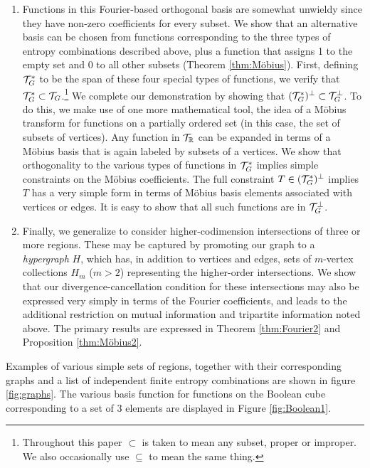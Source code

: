 \documentclass[12pt]{article}
\theoremstyle{definition}
\begin{document}
\begin{enumerate}
\item 
Functions in this Fourier-based orthogonal basis are somewhat unwieldy since they have non-zero coefficients for every subset. We show that an alternative basis can be chosen from functions corresponding to the three types of entropy combinations described above, plus a function that assigns 1 to the empty set and 0 to all other subsets (Theorem \ref{thm:Möbius}). First, defining ${\cal T}_G^*$ to be the span of these four special types of functions, we verify that ${\cal T}_G^* \subset {\cal T}_G$.\footnote{Throughout this paper $\subset$ is taken to mean any subset, proper or improper. We also occasionally use $\subseteq$ to mean the same thing.}  We complete our demonstration by showing that $({\cal T}_G^*)^\perp \subset {\cal T}_G^\perp$. To do this, we make use of one more mathematical tool, the idea of a Möbius transform for functions on a partially ordered set (in this case, the set of subsets of vertices). Any function in ${\cal T}_\mathbb{R}$ can be expanded in terms of a Möbius basis that is again labeled by subsets of a vertices. We show that orthogonality to the various types of functions in ${\cal T}_G^*$ implies simple constraints on the Möbius coefficients. The full constraint $T \in ({\cal T}_G^*)^\perp$ implies $T$ has a very simple form in terms of Möbius basis elements associated with vertices or edges. It is easy to show that all such functions are in ${\cal T}_G^\perp$. 
\item 
Finally, we generalize to consider higher-codimension intersections of three or more regions. These may be captured by promoting our graph to a {\it hypergraph} $H$, which has, in addition to vertices and edges, sets of $m$-vertex collections $H_m$ ($m > 2$) representing the higher-order intersections. We show that our divergence-cancellation condition for these intersections may also be expressed very simply in terms of the Fourier coefficients, and leads to the additional restriction on mutual information and tripartite information noted above. The primary results are expressed in Theorem \ref{thm:Fourier2} and Proposition \ref{thm:Möbius2}.
\end{enumerate}

Examples of various simple sets of regions, together with their corresponding graphs and a list of independent finite entropy combinations are shown in figure \ref{fig:graphs}. The various basis function  for functions on the Boolean cube corresponding to a set of 3 elements are displayed in Figure \ref{fig:Boolean1}.
\end{document}
